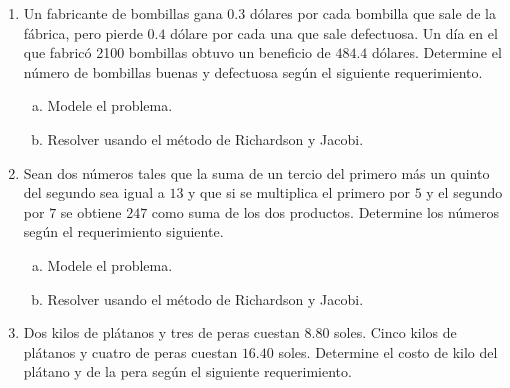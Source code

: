 \documentclass[
	spanish,
	8pt,
	utf8,
	xcolor=table,
	handout,
	aspectratio=169,
	professionalfonts,
	notheorems,
	mathserif,
]{beamer}
\begin{document}
\begin{frame}
	\begin{enumerate}
		\item

		      Un fabricante de bombillas gana $0.3$ dólares por cada
		      bombilla que sale de la fábrica, pero pierde $0.4$ dólare
		      por cada una que sale defectuosa.
		      Un día en el que fabricó 2100 bombillas obtuvo un beneficio
		      de $484.4$ dólares.
		      Determine el número de bombillas buenas y defectuosa según
		      el siguiente requerimiento.

		      \begin{multicols}{2}
			      \begin{enumerate}[a)]

				      \item

				            Modele el problema.


				      \item

				            Resolver usando el método de Richardson y Jacobi.

			      \end{enumerate}
		      \end{multicols}

		\item

		      Sean dos números tales que la suma de un tercio del primero
		      más un quinto del segundo sea igual a $13$ y que si se
		      multiplica el primero por $5$ y el segundo por $7$ se
		      obtiene $247$ como suma de los dos productos.
		      Determine los números según el requerimiento siguiente.

		      \begin{enumerate}[a)]

			      \item

			            Modele el problema.

			      \item

			            Resolver usando el método de Richardson y Jacobi.
		      \end{enumerate}

		\item

		      Dos kilos de plátanos y tres de peras cuestan $8.80$ soles.
		      Cinco kilos de plátanos y cuatro de peras cuestan $16.40$
		      soles.
		      Determine el costo de kilo del plátano y de la pera según
		      el siguiente requerimiento.


\end{enumerate}
\end{frame}
\end{document}

